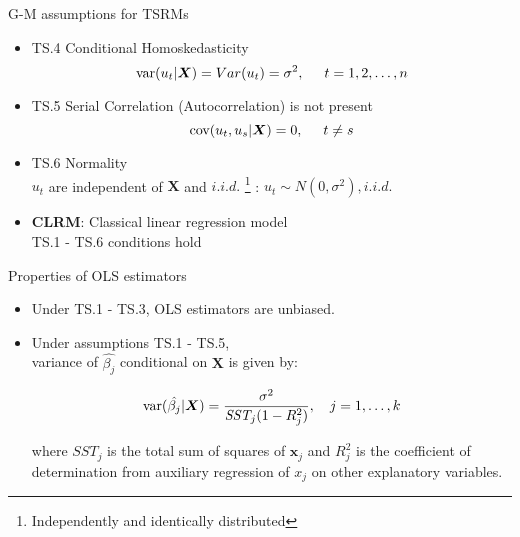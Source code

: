 \documentclass{beamer}
\begin{document}

\begin{frame}{G-M assumptions for TSRMs}
\begin{itemize}
 \item TS.4 Conditional Homoskedasticity 
 $$\textnormal{var}(u_t|\boldsymbol{X})=Var(u_t)=\sigma^2, \hspace{0.5cm} t=1,2,\dots,n$$
 
 \item TS.5 Serial Correlation (Autocorrelation) is not present $$ \textnormal{cov}(u_t,u_s|\boldsymbol{X}) = 0, \hspace{0.5cm} t\neq s$$

 \item TS.6 Normality \\
 $u_t$ are independent of $\boldsymbol{X}$ and $\textit{i.i.d.}$
 \footnote{Independently and identically distributed} 
 :  $u_t \sim N(0,\sigma^2), \textit{i.i.d.} $
 
 \vspace{0.6cm}
 
 \item \textbf{CLRM}: Classical linear regression model \\
 TS.1 - TS.6 conditions hold
 
\end{itemize}
\end{frame}


\begin{frame}{Properties of OLS estimators}
\begin{itemize}
\item Under TS.1 - TS.3, OLS estimators are unbiased.
\vspace{0.5cm}
\item Under assumptions TS.1 - TS.5, \\ 
variance of $\hat{\beta_j}$ conditional on $\boldsymbol{X}$ is given by: 

$$\textnormal{var}(\hat{\beta_j}|\boldsymbol{X}) 
  =\frac{\sigma^2}{\textit{SST}_j(1-R^2_j)}, \quad j=1,\dots,k$$

where $\textit{SST}_j$ is the total sum of squares of $\boldsymbol{x}_{j}$ and $R^2_j$ is the coefficient of determination from auxiliary regression of $x_j$ on other explanatory variables. 
\end{itemize}
\end{frame}
\end{document}
